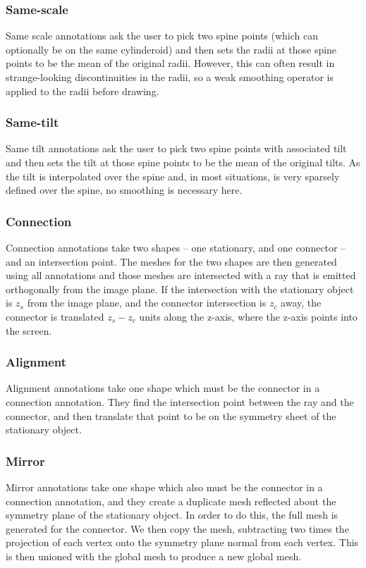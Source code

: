 \subsubsection{Same-scale}
Same scale annotations ask the user to pick two spine points (which can
optionally be on the same cylinderoid) and then sets the radii at those spine
points to be the mean of the original radii. However, this can often result in
strange-looking discontinuities in the radii, so a weak smoothing operator is
applied to the radii before drawing.

\subsubsection{Same-tilt}
Same tilt annotations ask the user to pick two spine points with associated tilt
and then sets the tilt at those spine points to be the mean of the original
tilts. As the tilt is interpolated over the spine and, in most situations, is
very sparsely defined over the spine, no smoothing is necessary here.

\subsubsection{Connection}
Connection annotations take two shapes -- one stationary, and one connector --
and an intersection point. The meshes for the two shapes are then generated
using all annotations and those meshes are intersected with a ray that is
emitted orthogonally from the image plane. If the intersection with the
stationary object is $z_s$ from the image plane, and the connector intersection
is $z_c$ away, the connector is translated $z_s - z_c$ units along the z-axis,
where the z-axis points into the screen.

\subsubsection{Alignment}
Alignment annotations take one shape which must be the connector in a connection
annotation. They find the intersection point between the ray and the connector,
and then translate that point to be on the symmetry sheet of the stationary
object.

\subsubsection{Mirror}
Mirror annotations take one shape which also must be the connector in a
connection annotation, and they create a duplicate mesh reflected about the
symmetry plane of the stationary object. In order to do this, the full mesh is
generated for the connector. We then copy the mesh, subtracting two times the
projection of each vertex onto the symmetry plane normal from each vertex. This
is then unioned with the global mesh to produce a new global mesh.

